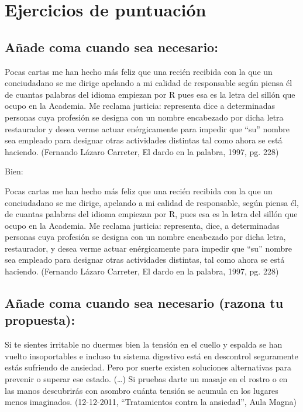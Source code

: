 \documentclass[12pt, a4paper, oneside]{report}
\begin{document}
    \chapter*{Ejercicios de puntuación}
    \setcounter{chapter}{4}
    \setcounter{section}{0}

    \section{Añade coma cuando sea necesario:}

    Pocas cartas me han hecho más feliz que una recién
    recibida con la que un conciudadano se me dirige apelando a
    mi calidad de responsable según piensa él de cuantas palabras
    del idioma empiezan por R pues esa es la letra del sillón que
    ocupo en la Academia. Me reclama justicia: representa dice a
    determinadas personas cuya profesión se designa con un
    nombre encabezado por dicha letra restaurador y desea verme
    actuar enérgicamente para impedir que “su” nombre sea
    empleado para designar otras actividades distintas tal como
    ahora se está haciendo.
    (Fernando Lázaro Carreter, El dardo en la palabra, 1997, pg. 228)

    Bien:

    Pocas cartas me han hecho más feliz que una recién
    recibida con la que un conciudadano se me dirige, apelando a
    mi calidad de responsable, según piensa él, de cuantas palabras
    del idioma empiezan por R, pues esa es la letra del sillón que
    ocupo en la Academia. Me reclama justicia: representa, dice, a
    determinadas personas cuya profesión se designa con un
    nombre encabezado por dicha letra, restaurador, y desea verme
    actuar enérgicamente para impedir que “su” nombre sea
    empleado para designar otras actividades distintas, tal como
    ahora se está haciendo.
    (Fernando Lázaro Carreter, El dardo en la palabra, 1997, pg. 228)

    \section{Añade coma cuando sea necesario (razona tu propuesta):}

    Si te sientes irritable no duermes bien la
    tensión en el cuello y espalda se han vuelto
    insoportables e incluso tu sistema digestivo está en
    descontrol seguramente estás sufriendo de
    ansiedad. Pero por suerte existen soluciones
    alternativas para prevenir o superar ese estado.
    (…)
    Si pruebas darte un masaje en el rostro o en
    las manos descubrirás con asombro cuánta tensión
    se acumula en los lugares menos imaginados.
    (12-12-2011, “Tratamientos contra la ansiedad”, Aula
    Magna)
\end{document}
